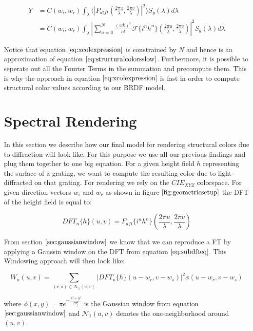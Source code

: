 \begin{align}
Y 
& = C(w_i,w_r) \int_{\lambda} \langle \left|P_{dtft}(\frac{2\pi u}{\lambda}, \frac{2\pi v}{\lambda})\right|^2\rangle S_y(\lambda)d\lambda \nonumber \\
& = C(w_i,w_r) \int_{\lambda} \left| \sum_{n=0}^N \frac{(wk)^n}{n!} \mathcal{F}\{i^n h^n\}(\frac{2\pi u}{\lambda}, \frac{2\pi v}{\lambda})\right|^2 S_y(\lambda)d\lambda
\label{eq:xcolexpression}
\end{align}

Notice that equation $\ref{eq:xcolexpression}$ is constrained by $N$ and hence is an approximation of equation $\ref{eq:structuralcolorsslow}$. Furthermore, it is possible to seperate out all the Fourier Terms in the summation and precompute them. This is why the approach in equation $\ref{eq:xcolexpression}$ is fast in order to compute structural color values according to our BRDF model.

\section{Spectral Rendering}
\label{sec:spectralrendering}
In this section we describe how our final model for rendering structural colors due to diffraction will look like. For this purpose we use all our previous findings and plug them together to one big equation. For a given height field $h$ representing the surface of a grating, we want to compute the resulting color due to light diffracted on that grating. For rendering we rely on the $CIE_{XYZ}$ colorspace. For given direction vectors $w_i$ and $w_r$ as shown in figure $\ref{fig:geometricsetup}$ the DFT of the height field is equal to:

\begin{equation}
DFT_{n}\{h\}(u,v) = {F}_{dft}\{i^n h^n\}(\frac{2\pi u}{\lambda},\frac{2\pi v}{\lambda})
\label{eq:subdfteq}
\end{equation}

From section $\ref{sec:gaussianwindow}$ we know that we can reproduce a FT by applying a Gaussin window on the DFT from equation $\ref{eq:subdfteq}$. This Windowing approach will then look like: 

\begin{equation}
  W_{n}(u,v) = \sum_{(r,s) \in \mathcal{N}_1(u,v)} \left| DFT_{n}\{h\}(u-w_r, v-w_s) \right|^2 \phi(u-w_r, v-w_s)
  \label{eq:wnwindowingapproachsub}
\end{equation}

where $\phi(x,y) = \pi e^{-\frac{x^2 + y^2}{2\sigma_{f}^2}}$ is the Gaussian window from equation $\ref{sec:gaussianwindow}$ and $\mathcal{N}_1(u,v)$ denotes the one-neighborhood around $(u,v)$. \\

